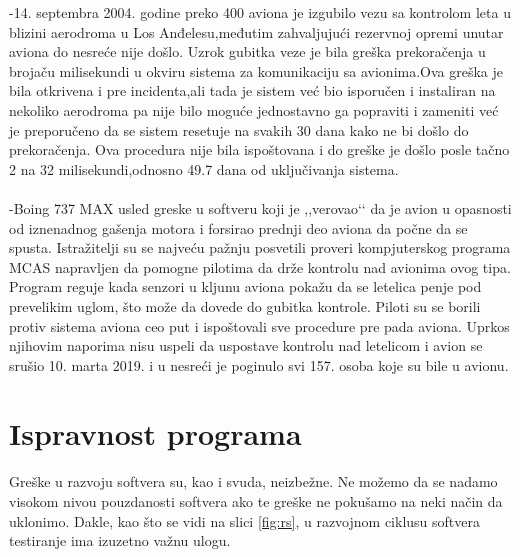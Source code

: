 \documentclass[a4paper]{article}
\begin{document}
-14. septembra 2004. godine preko 400 aviona je izgubilo vezu sa kontrolom leta u blizini aerodroma u Los Anđelesu,međutim zahvaljujući rezervnoj opremi unutar aviona do nesreće nije došlo. Uzrok gubitka veze je bila greška prekoračenja u brojaču milisekundi u okviru sistema za komunikaciju sa avionima.Ova greška je bila otkrivena i pre incidenta,ali tada je sistem već bio isporučen i instaliran na nekoliko aerodroma pa nije bilo moguće jednostavno ga popraviti i zameniti već je preporučeno da se sistem resetuje na svakih 30 dana kako ne bi došlo do prekoračenja. Ova procedura nije bila ispoštovana i do greške je došlo posle tačno 2 na {32} milisekundi,odnosno 49.7 dana od uključivanja sistema.\\
\\

-Boing 737 MAX  usled greske u softveru koji je ,,verovao‘‘ da je avion u opasnosti od iznenadnog gašenja motora i forsirao prednji deo aviona da počne da se spusta. Istražitelji su se najveću pažnju posvetili proveri kompjuterskog programa MCAS napravljen da pomogne pilotima da drže kontrolu nad avionima ovog tipa.
Program reguje kada senzori u kljunu aviona pokažu da se letelica penje pod prevelikim uglom, što može da dovede do gubitka kontrole.
Piloti su se borili protiv sistema aviona ceo put i ispoštovali sve procedure pre pada aviona. Uprkos njihovim naporima nisu uspeli da uspostave kontrolu nad letelicom i avion se srušio 10. marta 2019. i u nesreći je poginulo svi 157. osoba koje su bile u avionu.



\section{Ispravnost programa}
\label{sec:ispravnost}
Greške u razvoju softvera su, kao i svuda, neizbežne.
Ne možemo da se nadamo visokom nivou pouzdanosti softvera ako te greške ne pokušamo na neki način da uklonimo.
Dakle, kao što se vidi na slici \ref{fig:rs}, u razvojnom ciklusu softvera testiranje ima izuzetno važnu ulogu.
\end{document}
